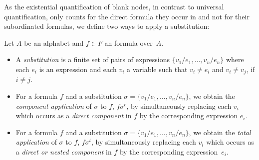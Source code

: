 
% 



As the existential quantification of blank nodes, in contrast to universal quantification, 
only counts for the direct formula they occur in and not for their subordinated formulas, 
we define two ways to apply a substitution:


\begin{definition}[Substitution]
%
Let $A$ be an \nthree alphabet 
and $f\in F$ an \nthree formula over~$A$. 
\begin{itemize}
 \item A \emph{substitution} is a finite set of pairs of expressions $\{v_1/e_1, \ldots, v_n/e_n\}$ where each $e_i$ is an expression and each $v_i$ 
 a variable such that $v_i\neq e_i$ and 
 $v_i \neq v_j$,
 if $i\neq j$.  
 \item 
 For a formula $f$ and a substitution $\sigma=\{v_1/e_1, \ldots, v_n/e_n\}$, we obtain the \emph{component application} 
 of $\sigma$ to $f$, $f\sigma^c$, by simultaneously replacing each $v_i$ 
 which occurs as a \emph{direct component} in $f$ by the corresponding expression $e_i$. 
 \item 
 For a formula $f$ and a substitution $\sigma=\{v_1/e_1, \ldots, v_n/e_n\}$, we obtain the \emph{total application} of $\sigma$ to $f$, $f\sigma^t$, 
 by simultaneously replacing each $v_i$ 
 which occurs as a \emph{direct or nested component} in $f$ by the corresponding expression~$e_i$. 
 \end{itemize}
\end{definition}

